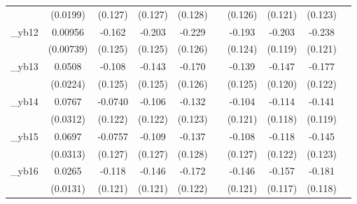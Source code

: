 \begin{table}[htbp]
\begin{tabular}{l*{9}{c}}
            &    (0.0199)         &     (0.127)         &     (0.127)         &     (0.128)         &                     &     (0.126)         &     (0.121)         &     (0.123)         &                     \\
[1em]
\_yb12       &     0.00956         &      -0.162         &      -0.203         &      -0.229\sym{*}  &                     &      -0.193         &      -0.203\sym{*}  &      -0.238\sym{**} &                     \\
            &   (0.00739)         &     (0.125)         &     (0.125)         &     (0.126)         &                     &     (0.124)         &     (0.119)         &     (0.121)         &                     \\
[1em]
\_yb13       &      0.0508\sym{**} &      -0.108         &      -0.143         &      -0.170         &                     &      -0.139         &      -0.147         &      -0.177         &                     \\
            &    (0.0224)         &     (0.125)         &     (0.125)         &     (0.126)         &                     &     (0.125)         &     (0.120)         &     (0.122)         &                     \\
[1em]
\_yb14       &      0.0767\sym{**} &     -0.0740         &      -0.106         &      -0.132         &                     &      -0.104         &      -0.114         &      -0.141         &                     \\
            &    (0.0312)         &     (0.122)         &     (0.122)         &     (0.123)         &                     &     (0.121)         &     (0.118)         &     (0.119)         &                     \\
[1em]
\_yb15       &      0.0697\sym{**} &     -0.0757         &      -0.109         &      -0.137         &                     &      -0.108         &      -0.118         &      -0.145         &                     \\
            &    (0.0313)         &     (0.127)         &     (0.127)         &     (0.128)         &                     &     (0.127)         &     (0.122)         &     (0.123)         &                     \\
[1em]
\_yb16       &      0.0265\sym{**} &      -0.118         &      -0.146         &      -0.172         &                     &      -0.146         &      -0.157         &      -0.181         &                     \\
            &    (0.0131)         &     (0.121)         &     (0.121)         &     (0.122)         &                     &     (0.121)         &     (0.117)         &     (0.118)         &                     \\

\end{tabular}
\end{table}
